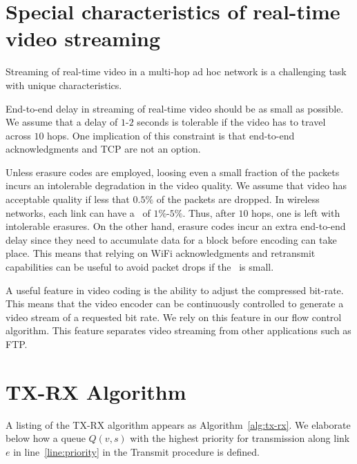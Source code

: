 \documentclass[12pt]{article}
\newenvironment{proof sketch}[1]{\noindent {\emph{Proof sketch of #1:}}}{\hfill \qed}
\newcommand{\PER}{\text{\sc{per}}}
\begin{document}
\section{Special characteristics of real-time video streaming}
\label{sec:video streaming}
Streaming of real-time video in a multi-hop ad hoc network is a
challenging task with unique characteristics.
\begin{inparaenum}[(1)]
\item End-to-end delay in streaming of real-time video should be as
  small as possible.  We assume that a delay of $1$-$2$ seconds is
  tolerable if the video has to travel across $10$ hops.  One
  implication of this constraint is that end-to-end acknowledgments and TCP are
  not an option.
\item Unless erasure codes are employed, loosing even a small fraction
  of the packets incurs an intolerable degradation in the video
  quality. We assume that video has acceptable quality if less that
  $0.5\%$ of the packets are dropped. In wireless networks, each link
  can have a \PER\ of $1\%$-$5\%$. Thus, after $10$ hops, one is left
  with intolerable erasures.  On the other hand, erasure codes incur an
  extra end-to-end delay since they need to accumulate data for a
  block before encoding can take place. This means that relying on
  WiFi acknowledgments and retransmit capabilities can be useful to
  avoid packet drops if the \PER\ is small.
\item A useful feature in video coding is the ability to adjust the
  compressed bit-rate. This means that the video encoder can be
  continuously controlled to generate a video stream of a requested
  bit rate. We rely on this feature in our flow control algorithm.
  This feature separates video streaming from other applications such
  as FTP.
\end{inparaenum}

\section{TX-RX Algorithm} \label{sec:algs}
A listing of the TX-RX algorithm appears as Algorithm~\ref{alg:tx-rx}.
We elaborate below how a queue $Q(v,s)$ with the highest priority for
transmission along link $e$ in line~\ref{line:priority} in the
Transmit procedure is defined.
\end{document}
